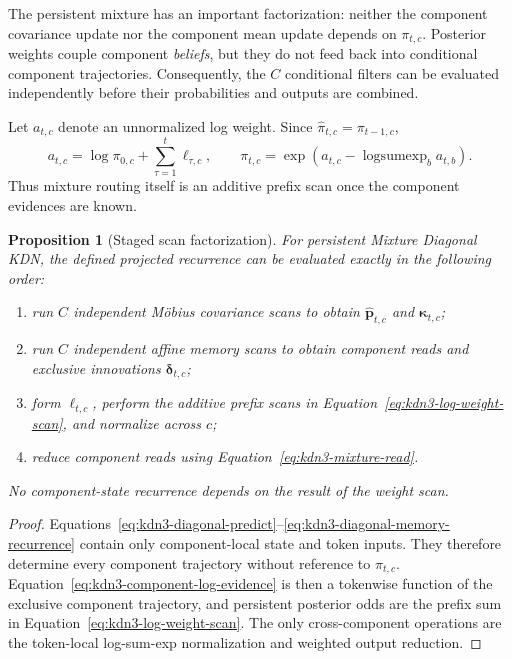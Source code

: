 \documentclass[11pt]{article}
\newcommand{\ve}[1]{\boldsymbol{#1}}
\newcommand{\logsumexp}{\operatorname{logsumexp}}
\newtheorem{proposition}{Proposition}
\begin{document}
The persistent mixture has an important factorization: neither the component covariance update
nor the component mean update depends on $\pi_{t,c}$.  Posterior weights couple component
\emph{beliefs}, but they do not feed back into conditional component trajectories.  Consequently,
the $C$ conditional filters can be evaluated independently before their probabilities and outputs
are combined.

Let $a_{t,c}$ denote an unnormalized log weight.  Since
$\widehat\pi_{t,c}=\pi_{t-1,c}$,
\begin{equation}
  a_{t,c}
  =\log\pi_{0,c}+\sum_{\tau=1}^{t}\ell_{\tau,c},
  \qquad
  \pi_{t,c}
  =\exp\left(
    a_{t,c}-\logsumexp_{b}a_{t,b}
  \right).
  \label{eq:kdn3-log-weight-scan}
\end{equation}
Thus mixture routing itself is an additive prefix scan once the component evidences are known.

\begin{proposition}[Staged scan factorization]
\label{prop:kdn3-staged-scan}
For persistent Mixture Diagonal KDN, the defined projected recurrence can be evaluated exactly in
the following order:
\begin{enumerate}
  \item run $C$ independent M\"obius covariance scans to obtain
        $\widehat{\ve{p}}_{t,c}$ and $\ve{\kappa}_{t,c}$;
  \item run $C$ independent affine memory scans to obtain component reads and exclusive
        innovations $\ve{\delta}_{t,c}$;
  \item form $\ell_{t,c}$, perform the additive prefix scans in
        Equation~\eqref{eq:kdn3-log-weight-scan}, and normalize across $c$;
  \item reduce component reads using Equation~\eqref{eq:kdn3-mixture-read}.
\end{enumerate}
No component-state recurrence depends on the result of the weight scan.
\end{proposition}

\begin{proof}
Equations~\eqref{eq:kdn3-diagonal-predict}--\eqref{eq:kdn3-diagonal-memory-recurrence} contain only
component-local state and token inputs.  They therefore determine every component trajectory
without reference to $\pi_{t,c}$.  Equation~\eqref{eq:kdn3-component-log-evidence} is then a
tokenwise function of the exclusive component trajectory, and persistent posterior odds are the
prefix sum in Equation~\eqref{eq:kdn3-log-weight-scan}.  The only cross-component operations are
the token-local log-sum-exp normalization and weighted output reduction.
\end{proof}
\end{document}
